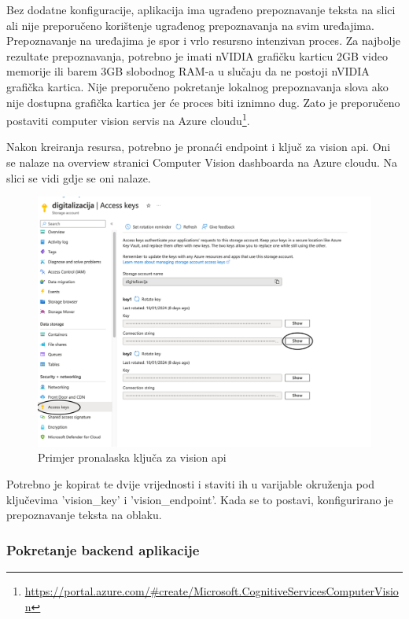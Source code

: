 			{Bez dodatne konfiguracije, aplikacija ima ugrađeno prepoznavanje teksta na slici ali nije preporučeno korištenje ugrađenog prepoznavanja na svim uređajima. Prepoznavanje na uređajima je spor i vrlo resursno intenzivan proces. Za najbolje rezultate prepoznavanja, potrebno je imati nVIDIA grafičku karticu 2GB video memorije ili barem 3GB slobodnog RAM-a u slučaju da ne postoji nVIDIA grafička kartica. Nije preporučeno pokretanje lokalnog prepoznavanja slova ako nije dostupna grafička kartica jer će proces biti iznimno dug. Zato je preporučeno postaviti computer vision servis na Azure cloudu\footnote{\url{https://portal.azure.com/\#create/Microsoft.CognitiveServicesComputerVision}}.}
			
			{Nakon kreiranja resursa, potrebno je pronaći endpoint i ključ za vision api. Oni se nalaze na overview stranici Computer Vision dashboarda na Azure cloudu. Na slici se vidi gdje se oni nalaze.}
			
			\begin{figure}[H]
				\includegraphics[width=\textwidth]{slike/accessKey.png}
				\caption{Primjer pronalaska ključa za vision api}
				\label{fig:visionApiKey}
			\end{figure}
			
			{Potrebno je kopirat te dvije vrijednosti i staviti ih u varijable okruženja pod ključevima 'vision\_key' i 'vision\_endpoint'. Kada se to postavi, konfigurirano je prepoznavanje teksta na oblaku.}
			
			\subsubsection{Pokretanje backend aplikacije}
			
